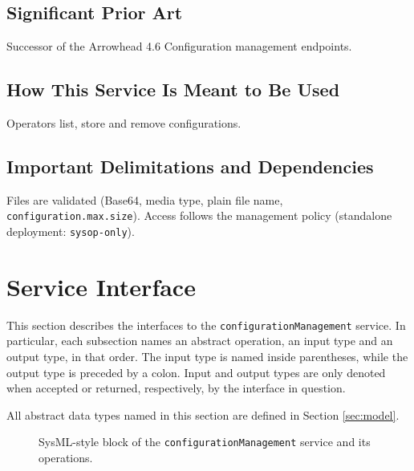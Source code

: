 \documentclass[a4paper]{arrowhead}
\begin{document}
\subsection{Significant Prior Art}

Successor of the Arrowhead 4.6 Configuration management endpoints.

\subsection{How This Service Is Meant to Be Used}

Operators list, store and remove configurations.

\subsection{Important Delimitations and Dependencies}
\label{sec:delimitations}

Files are validated (Base64, media type, plain file name, \texttt{configuration.\allowbreak{}max.\allowbreak{}size}). Access follows the management policy (standalone deployment: \texttt{sysop-\allowbreak{}only}).

\newpage

\section{Service Interface}
\label{sec:operations}

This section describes the interfaces to the \texttt{configuration\allowbreak{}Management} service.
In particular, each subsection names an abstract operation, an input type and an output type, in that order.
The input type is named inside parentheses, while the output type is preceded by a colon.
Input and output types are only denoted when accepted or returned, respectively, by the interface in question.

All abstract data types named in this section are defined in Section \ref{sec:model}.

\begin{figure}[ht!]
  \centering
  \caption{SysML-style block of the \texttt{configuration\allowbreak{}Management} service and its operations.}
  \label{fig:SD}
\end{figure}
\end{document}
